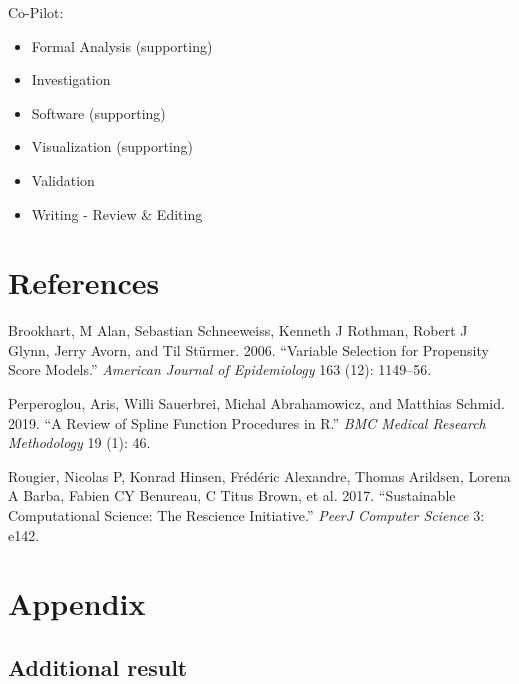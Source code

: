 \documentclass[10,a4paperpaper,]{article}
\begin{document}
Co-Pilot:

\begin{itemize}
\tightlist
\item
  Formal Analysis (supporting)\\
\item
  Investigation\\
\item
  Software (supporting)\\
\item
  Visualization (supporting)\\
\item
  Validation\\
\item
  Writing - Review \& Editing
\end{itemize}

\newpage

\section*{References}
\begingroup
\hphantom{x}
\setlength{\parindent}{-0.5in}
\setlength{\leftskip}{0.5in}

\hypertarget{refs}{}
\leavevmode\hypertarget{ref-brookhart2006variable}{}%
Brookhart, M Alan, Sebastian Schneeweiss, Kenneth J Rothman, Robert J
Glynn, Jerry Avorn, and Til Stürmer. 2006. ``Variable Selection for
Propensity Score Models.'' \emph{American Journal of Epidemiology} 163
(12): 1149--56.

\leavevmode\hypertarget{ref-perperoglou2019review}{}%
Perperoglou, Aris, Willi Sauerbrei, Michal Abrahamowicz, and Matthias
Schmid. 2019. ``A Review of Spline Function Procedures in R.'' \emph{BMC
Medical Research Methodology} 19 (1): 46.

\leavevmode\hypertarget{ref-rougier2017sustainable}{}%
Rougier, Nicolas P, Konrad Hinsen, Frédéric Alexandre, Thomas Arildsen,
Lorena A Barba, Fabien CY Benureau, C Titus Brown, et al. 2017.
``Sustainable Computational Science: The Rescience Initiative.''
\emph{PeerJ Computer Science} 3: e142.

\FloatBarrier
\endgroup
\newpage

\section*{Appendix}

\subsection*{Additional result}
\end{document}

